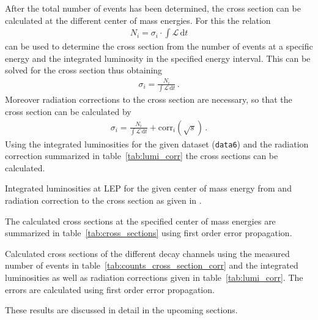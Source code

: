 \documentclass[11pt, a4paper]{article}
\numberwithin{equation}{section}
\newcommand\dinf[1]{ \,\mathrm{d}#1 }
\begin{document}
After the total number of events has been determined, the cross section can be calculated at the different center of mass energies.
For this the relation
\begin{align*}
	N_i = \sigma_i \cdot \int \mathcal{L} \dinf{t}
\end{align*}
can be used to determine the cross section from the number of events at a specific energy and the integrated luminosity in the specified energy interval.
This can be solved for the cross section thus obtaining
\begin{align*}
	\sigma_i = \frac{N_i}{\int \mathcal{L} \dinf{t}} \, \text{.}
\end{align*}
Moreover radiation corrections to the cross section are necessary, so that the cross section can be calculated by
\begin{align*}
	\sigma_i = \frac{N_i}{\int \mathcal{L} \dinf{t}} + \mathrm{corr}_i(\sqrt{s}) \,\text{.}
\end{align*}
Using the integrated luminosities for the given dataset (\texttt{data6}) and the radiation correction summarized in table~\ref{tab:lumi_corr} the cross sections can be calculated.
\begin{table}[h]
	\centering
	
	\caption{Integrated luminosities at LEP for the given center of mass energy from \cite{anleitung} and radiation correction to the cross section as given in \cite{instructions}.}
	\label{tab:lumi_corr}
\end{table}
The calculated cross sections at the specified center of mass energies are summarized in table~\ref{tab:cross_sections} using first order error propagation.
\begin{table}[h]
	\centering
	
	\caption{Calculated cross sections of the different decay channels using the measured number of events in table~\ref{tab:counts_cross_section_corr} and the integrated luminosities as well as radiation corrections given in table~\ref{tab:lumi_corr}. The errors are calculated using first order error propagation.}
	\label{tab:cross_sections}
\end{table}
These results are discussed in detail in the upcoming sections.
\end{document}
